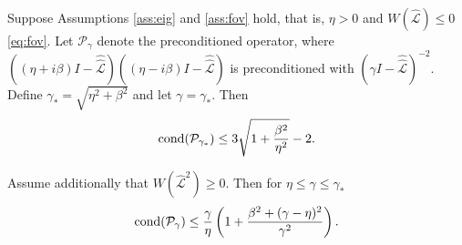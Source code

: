 \documentclass[review]{siamart}
\begin{document}
\begin{theorem}\label{th:cond}
Suppose Assumptions \ref{ass:eig} and \ref{ass:fov} hold, that is, $\eta > 0$
and $W(\widehat{\mathcal{L}}) \leq 0$ \eqref{eq:fov}. Let $\mathcal{P}_\gamma$ denote
the preconditioned operator, where $((\eta + i\beta)I -
\widehat{\widehat{\mathcal{L}}})((\eta - i\beta)I - \widehat{\widehat{\mathcal{L}}})$ is
preconditioned with $(\gamma I - \widehat{\widehat{\mathcal{L}}})^{-2}$.
Define $\gamma_* = \sqrt{\eta^2+\beta^2}$ and let $\gamma = \gamma_*$. Then
%
\begin{align}\label{eq:gammastar}
\textnormal{cond}(\mathcal{P}_{\gamma_*}) \leq 
	3\sqrt{1+\frac{\beta^2}{\eta^2}} - 2.
\end{align}

Assume additionally that $W(\widehat{\mathcal{L}}^2) \geq 0$. Then for
$\eta \leq \gamma \leq \gamma_*$ 
\begin{align}\label{eq:cond_gen}
\textnormal{cond}(\mathcal{P}_\gamma) \leq \frac{\gamma}{\eta}
	\left(1 + \frac{\beta^2 + (\gamma-\eta)^2}{\gamma^2}\right).
\end{align}
\end{theorem}
\end{document}
